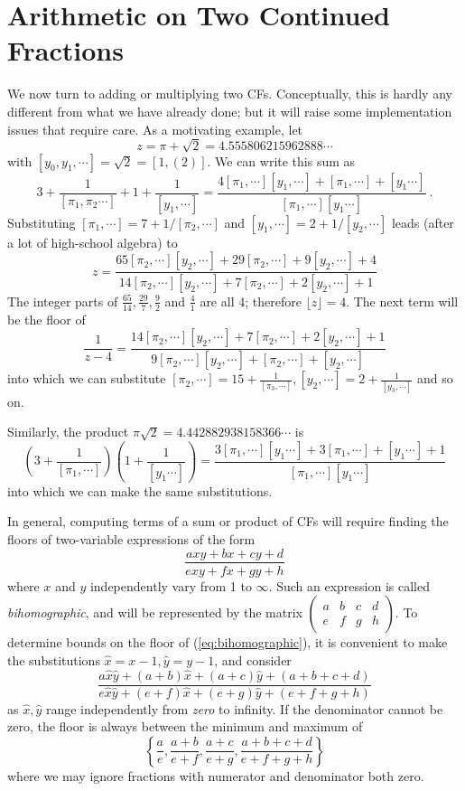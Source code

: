 \documentclass[11pt, oneside]{amsart}   	%
\newcommand{\abcd}{\left(
\begin{smallmatrix} 
a & b & c & d\\ 
e & f & g & h
\end{smallmatrix}
\right)}
\begin{document}
\section{Arithmetic on Two Continued Fractions}
We now turn to adding or multiplying two CFs. Conceptually, this is hardly any different from what we have already done;
but it will raise some implementation issues that require care. As a motivating example, let
\[
z = \pi + \sqrt{2} = 4.555806215962888\cdots
\]
 with $[y_0, y_1,\cdots] = \sqrt{2} = [1,(2)]$. We can write this sum as
\begin{equation*}
3 + \frac{1}{[\pi_1,\pi_2\cdots]} + 1 + \frac{1}{[y_1,\cdots]} = \frac{ 4[\pi_1,\cdots][y_1,\cdots] + [\pi_1,\cdots]  + [y_1\cdots]}{ [\pi_1,\cdots][y_1\cdots] }\ .
\end{equation*}
Substituting $[\pi_1,\cdots] = 7 + 1/[\pi_2,\cdots]$ and $[y_1,\cdots] = 2 + 1/[y_2,\cdots]$ leads (after a lot of high-school algebra) to 
\begin{equation*}
z = \frac{65[\pi_2,\cdots] [y_2,\cdots] + 29[\pi_2,\cdots] +9[y_2,\cdots] +4}{14[\pi_2,\cdots] [y_2,\cdots] + 7[\pi_2,\cdots] +2[y_2,\cdots] +1}
\end{equation*}
The integer parts of $\frac{65}{14}, \frac{29}{7}, \frac{9}{2}$ and  $\frac{4}{1}$ are all 4; therefore $\lfloor z \rfloor =4$.
The next term will be the floor of
\begin{equation*}
\frac{1}{z-4} =  \frac{14[\pi_2,\cdots] [y_2,\cdots] + 7[\pi_2,\cdots] +2[y_2,\cdots] +1}{9[\pi_2,\cdots] [y_2,\cdots] + [\pi_2,\cdots] +[y_2,\cdots]}
\end{equation*}
into which we can substitute  $[\pi_2,\cdots]=15+\frac{1}{[\pi_3,\cdots]},  [y_2,\cdots]=2+\frac{1}{[y_3,\cdots]}$ and so on.

Similarly, the product $\pi\sqrt{2}=4.442882938158366\cdots$ is
\begin{equation*}
(3 + \frac{1}{[\pi_1,\cdots]})(1 + \frac{1}{[y_1\cdots]}) 
  = \frac{ 3[\pi_1,\cdots][y_1\cdots] + 3[\pi_1,\cdots] + [y_1\cdots] +1 }{[\pi_1,\cdots][y_1\cdots] }
\end{equation*}
into which we can make the same substitutions. 

In general, computing terms of a sum or product of CFs will require finding the floors of two-variable expressions of the form
\begin{equation}\label{eq:bihomographic}
\frac{axy + bx + cy + d}{exy + fx + gy + h}
\end{equation}
where $x$ and $y$ independently vary from 1 to $\infty$. Such an expression is called \emph{bihomographic}, and will be
represented by the matrix $\abcd$. To determine bounds on the floor of (\ref{eq:bihomographic}), it is convenient to make the
substitutions $\hat{x} = x-1, \hat{y} = y-1$, and consider
\[
\frac{a\hat{x}\hat{y} + (a+b)\hat{x} + (a+c)\hat{y} + (a+b+c+d)}{e\hat{x}\hat{y} + (e+f)\hat{x} + (e+g)\hat{y} + (e+f+g+h)}
\]
as $\hat{x}, \hat{y}$ range independently from \emph{zero} to infinity. If the denominator cannot be zero, the floor is always
between the minimum and maximum of
\[
\left\{ \frac{a}{e},\frac{a+b}{e+f},\frac{a+c}{e+g},\frac{a+b+c+d}{e+f+g+h} \right\}
\]
where we may ignore fractions with numerator and denominator both zero.
\end{document}
